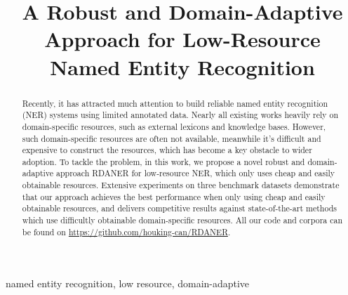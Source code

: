 \documentclass[10pt, conference, compsocconf]{IEEEtran}
\newcommand{\rdaner}{\textsc{RDANER}\xspace}
\begin{document}
\title{A Robust and Domain-Adaptive Approach for Low-Resource Named Entity Recognition}


\author{
}



\maketitle

\begin{abstract}
    Recently, it has attracted much attention to build reliable named entity recognition (NER)
    systems using limited annotated data.
    Nearly all existing works heavily rely on domain-specific resources, such as external lexicons and knowledge bases. 
    However, such domain-specific resources are often not available,
    meanwhile it's difficult and expensive to construct the resources, 
    which has become a key obstacle to wider adoption.
To tackle the problem, in this work, we propose a novel robust and domain-adaptive approach \rdaner 
    for low-resource NER, which only uses cheap and easily obtainable resources. 
    Extensive experiments on three benchmark datasets demonstrate that
    our approach achieves the best performance when
only using cheap and easily obtainable resources, and delivers competitive results
against state-of-the-art methods which use difficultly obtainable domain-specific resources.
All our code and corpora can be found on \url{https://github.com/houking-can/RDANER}.

\end{abstract}

\begin{IEEEkeywords}
    named entity recognition, low resource, domain-adaptive
\end{IEEEkeywords}
\end{document}
